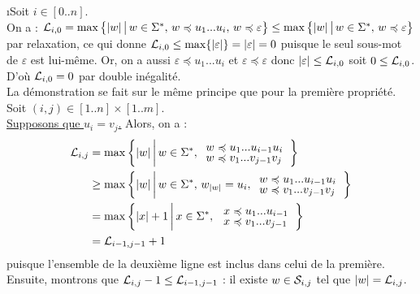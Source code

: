 		\eqskip{2mm}
		\begin{Preuve}[la propriété]
			\i Soit \( i \in [0..n] \).	\\
			On a : \( \cal{L}_{i,0} = \max \left\{ |w| \,\middle|\, w \in \Sigma^*, \, w \preccurlyeq u_1 ... u_i, \, w \preccurlyeq \varepsilon \right\} \leq \max \left\{ |w| \,\middle|\, w \in \Sigma^*,\, w \preccurlyeq \varepsilon \right\}\) par relaxation, ce qui donne \(\cal{L}_{i,0} \leq \max \{|\varepsilon|\} = |\varepsilon| = 0 \) puisque le seul sous-mot de \(\varepsilon\) est lui-même. Or, on a aussi \( \varepsilon \preccurlyeq u_1 ... u_i \) et \( \varepsilon \preccurlyeq \varepsilon \) donc \( |\varepsilon| \leq \cal{L}_{i,0} \) soit \( 0 \leq \cal{L}_{i,0} \). \nt
			D'où \( \cal{L}_{i,0} = 0 \) par double inégalité.
			\\[3mm]
			\ii La démonstration se fait sur le même principe que pour la première propriété.
			\\[3mm]
			\iii Soit \( (i,j) \in [1..n] \times [1..m] \). \\
			\underline{\bdot Supposons que \( u_i = v_j \).} Alors, on a :
			\begin{align*}
				\cal{L}_{i,j} & = \max \bigg\{ |w| \,\bigg|\, w \in \Sigma^*,
				\begin{tabular}[h]{l}
					$w \preccurlyeq u_1 ... u_{i-1} u_i$ \\[-1mm]
					$w \preccurlyeq v_1 ... v_{j-1} v_j$
				\end{tabular}
				\bigg\} \\
				& \geq \max \bigg\{ |w| \,\bigg|\, w \in \Sigma^*, \, w_{|w|} = u_i,
				\begin{tabular}[h]{l}
					$w \preccurlyeq u_1 ... u_{i-1} u_i$ \\[-1mm]
					$w \preccurlyeq v_1 ... v_{j-1} v_j$
				\end{tabular}
				\bigg\} \\
				& = \max \left\{ |x| + 1 \, \middle| \, x \in \Sigma^*, \,
				\begin{tabular}[h]{l}
					$x \preccurlyeq u_1 ... u_{i-1}$ \\[-1mm]
					$x \preccurlyeq v_1 ... v_{j-1}$
				\end{tabular}
				\right\} \\
				& = \cal{L}_{i-1,j-1} + 1
		\end{align*}
	puisque l'ensemble de la deuxième ligne est inclus dans celui de la première. \nt
\renewcommand{\arraystretch}{1}
Ensuite, montrons que \( \cal{L}_{i,j} - 1 \leq \cal{L}_{i-1,j-1} \) : il existe \( w \in \cal{S}_{i,j} \) tel que \( |w| = \cal{L}_{i,j} \). 

\end{Preuve}
